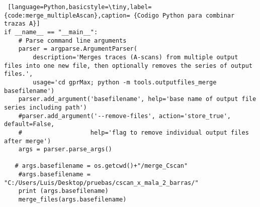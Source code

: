 \begin{lstlisting} [language=Python,basicstyle=\tiny,label={code:merge_multipleAscan},caption= {Codigo Python para combinar trazas A}]
if __name__ == "__main__":
    # Parse command line arguments
    parser = argparse.ArgumentParser(
        description='Merges traces (A-scans) from multiple output files into one new file, then optionally removes the series of output files.',
        usage='cd gprMax; python -m tools.outputfiles_merge basefilename')
    parser.add_argument('basefilename', help='base name of output file series including path')
    #parser.add_argument('--remove-files', action='store_true', default=False,
    #                   help='flag to remove individual output files after merge')
    args = parser.parse_args()

   # args.basefilename = os.getcwd()+"/merge_Cscan"
    #args.basefilename = "C:/Users/Luis/Desktop/pruebas/cscan_x_mala_2_barras/"
    print (args.basefilename)
    merge_files(args.basefilename)




\end{lstlisting}